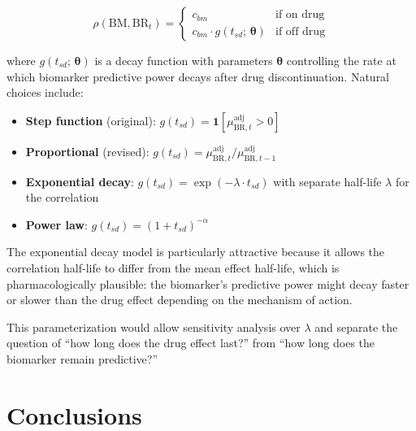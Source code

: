 \documentclass[11pt]{article}
\begin{document}
\[
\rho(\text{BM}, \text{BR}_t) =
\begin{cases}
c_{bm} & \text{if on drug} \\[4pt]
c_{bm} \cdot g(t_{sd};\, \boldsymbol{\theta}) &
  \text{if off drug}
\end{cases}
\]

where $g(t_{sd};\, \boldsymbol{\theta})$ is a decay function
with parameters $\boldsymbol{\theta}$ controlling the rate
at which biomarker predictive power decays after drug
discontinuation. Natural choices include:

\begin{itemize}
\item \textbf{Step function} (original):
  $g(t_{sd}) = \mathbf{1}[\mu_{\text{BR},t}^{\text{adj}} > 0]$
\item \textbf{Proportional} (revised):
  $g(t_{sd}) = \mu_{\text{BR},t}^{\text{adj}} /
  \mu_{\text{BR},t-1}^{\text{adj}}$
\item \textbf{Exponential decay}:
  $g(t_{sd}) = \exp(-\lambda \cdot t_{sd})$ with separate
  half-life $\lambda$ for the correlation
\item \textbf{Power law}:
  $g(t_{sd}) = (1 + t_{sd})^{-\alpha}$
\end{itemize}

The exponential decay model is particularly attractive because
it allows the correlation half-life to differ from the mean
effect half-life, which is pharmacologically plausible: the
biomarker's predictive power might decay faster or slower
than the drug effect depending on the mechanism of action.

This parameterization would allow sensitivity analysis over
$\lambda$ and separate the question of ``how long does the
drug effect last?'' from ``how long does the biomarker remain
predictive?''

\section{Conclusions}
\end{document}
